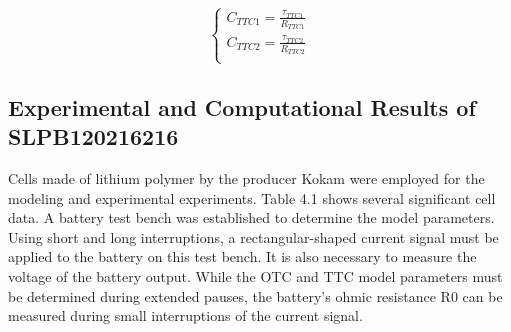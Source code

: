 \begin{equation}\label{eq:Batt_TTC_C_TTC}
	\begin{cases}
		C_{TTC1} = \frac{\tau_{TTC1}}{R_{TTC1}} \\
		C_{TTC2} = \frac{\tau_{TTC2}}{R_{TTC2}} \\
	\end{cases}
\end{equation}

\subsection{Experimental and Computational Results of SLPB120216216}
Cells made of lithium polymer by the producer Kokam were employed for the modeling and experimental experiments.
Table 4.1 shows several significant cell data. A battery test bench was established to determine the model parameters. Using short and long interruptions, a rectangular-shaped current signal must be applied to the battery on this test bench. It is also necessary to measure the voltage of the battery output. While the OTC and TTC model parameters must be determined during extended pauses, the battery's ohmic resistance R0 can be measured during small interruptions of the current signal.

